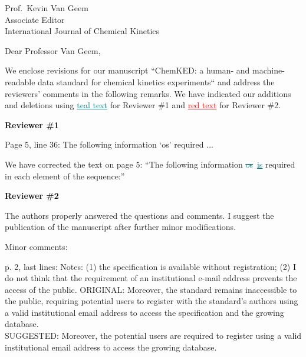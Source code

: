 \documentclass[11pt]{OSUletter}
\date{\vspace{10mm} \today}
\makeatletter
\newcommand{\addone}[1]{{\sloppy\textcolor{teal}{\uline{#1}}}}  %
\newcommand{\deleteone}[1]{\sloppy\textcolor{teal}{\sout{#1}}}    %
\newcommand{\addtwo}[1]{{\sloppy\textcolor{red}{\uline{#1}}}}  %
\def\Where{\hspace{-1.2mm}\textbf{\color{osuorange}
School of Mechanical, Industrial, and Manufacturing Engineering
}}
\def\Address{320 Rogers Hall\\
2000 SW Monroe Ave
}
\def\CityZip{Corvallis, OR~~97331-6001}
\def\Email{{\color{osuorange}email}: kyle.niemeyer@oregonstate.edu}
\def\TEL{{\color{osuorange}P}: 541-737-5614}
\def\URL{{\color{osuorange}URL}: \url{https://niemeyer-research-group.github.io}}
\def\newaddress{
\Where\\
\Address\\
\CityZip\\
\TEL\\
\Email\\
\URL
}
\makeatother
\begin{document}
%
%
%
\begin{letter}{
               Prof.~Kevin Van Geem\\
               Associate Editor\\
               International Journal of Chemical Kinetics
               }
%

%
\opening{Dear Professor Van Geem,}

%
We enclose revisions for our manuscript ``ChemKED: a human- and machine-readable
data standard for chemical kinetics experiments``
and address the reviewers' comments in the following remarks.
We have indicated our additions and deletions using \addone{teal text}
for Reviewer \#1 and \addtwo{red text} for Reviewer \#2.


{\bf Reviewer \#1}
\begin{quoting}
Page 5, line 36: The following information `os' required ...
\end{quoting}

We have corrected the text on page 5: ``The following information
\deleteone{os}~\addone{is} required in each element of the sequence:''

\vspace{2em}


{\bf Reviewer \#2}
\begin{quoting}
    The authors properly answered the questions and comments. I suggest the publication
    of the manuscript after further minor modifications.

    Minor comments:

    p. 2, last lines:
    Notes: (1) the specification is available without registration; (2) I do not think
    that the requirement of an institutional e-mail address prevents the access of the public.
    ORIGINAL:
    Moreover, the standard remains inaccessible to the public, requiring potential
    users to register with the standard's authors using a valid institutional email
    address to access the specification and the growing database. \\
    SUGGESTED:
    Moreover, the potential users are required to register using a valid institutional
    email address to access the growing database.
\end{quoting}


\end{letter}
\end{document}
